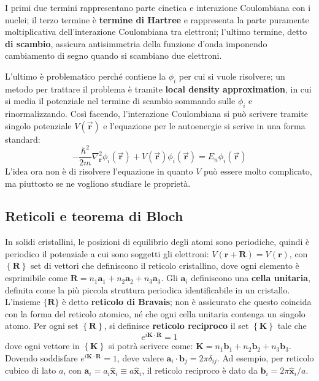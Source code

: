 \documentclass[10pt, a4paper]{scrartcl}
\numberwithin{equation}{subsection}
\theoremstyle{style1}
\begin{document}
I primi due termini rappresentano parte cinetica e interazione Coulombiana con i nuclei; il terzo termine \`e \textbf{termine di Hartree} e rappresenta la parte puramente moltiplicativa dell'interazione Coulombiana tra elettroni; l'ultimo termine, detto \textbf{di scambio}, assicura antisimmetria della funzione d'onda imponendo cambiamento di segno quando si scambiano due elettroni.

L'ultimo \`e problematico perch\'e contiene la $\phi _i$ per cui si vuole risolvere;
un metodo per trattare il problema \`e tramite \textbf{local density approximation}, in cui si media il potenziale nel termine di scambio sommando sulle $\phi _i$ e rinormalizzando. 
Cos\`i facendo, l'interazione Coulombiana si pu\`o scrivere tramite singolo potenziale $V(\vec{\mathbf{r} })$ e l'equazione per le autoenergie si scrive in una forma standard:
\begin{equation}\label{eser}
	-\frac{\hbar ^2}{2m} \nabla ^2_\mathbf{r} \phi _i(\vec{\mathbf{r} }) + V(\vec{\mathbf{r} }) \phi _i (\vec{\mathbf{r} }) = E_n \phi _i (\vec{\mathbf{r} })
\end{equation}
L'idea ora non \`e di risolvere l'equazione in quanto $V$ pu\`o essere molto complicato, ma piuttosto se ne vogliono studiare le propriet\`a.
\subsection{Reticoli e teorema di Bloch}
In solidi cristallini, le posizioni di equilibrio degli atomi sono periodiche, quindi \`e periodico il potenziale a cui sono soggetti gli elettroni: $V(\mathbf{r} +\mathbf{R} ) = V(\mathbf{r} )$, con $\left\{ \mathbf{R}  \right\} $ set di vettori che definiscono il reticolo cristallino, dove ogni elemento \`e esprimibile come $\mathbf{R} = n_1\mathbf{a} _1 + n_2 \mathbf{a} _2 + n_3 \mathbf{a} _3$. 
Gli $\mathbf{a} _i$ definiscono una \textbf{cella unitaria}, definita come la pi\`u piccola struttura periodica identificabile in un cristallo. 
L'insieme $\{\mathbf{R} \}$ \`e detto \textbf{reticolo di Bravais}; non \`e assicurato che questo coincida con la forma del reticolo atomico, n\'e che ogni cella unitaria contenga un singolo atomo.
Per ogni set $\left\{ \mathbf{R}  \right\} $, si definisce \textbf{reticolo reciproco} il set $\left\{ \mathbf{K}  \right\} $ tale che
\[
e^{i \mathbf{K} \cdot \mathbf{R} }  =1 
\] 
dove ogni vettore in $\left\{ \mathbf{K}  \right\} $ si potr\`a scrivere come: $\mathbf{K}  = n_1 \mathbf{b} _1 + n_2 \mathbf{b} _2 + n_3 \mathbf{b} _3$.
Dovendo soddisfare $e^{i \mathbf{K} \cdot \mathbf{R} } = 1$, deve valere $\mathbf{a} _i \cdot \mathbf{b} _j = 2\pi \delta _{ij} $.
Ad esempio, per reticolo cubico di lato $a$, con $\mathbf{a} _i = a_i \hat{\mathbf{x} }_i\equiv a \hat{\mathbf{x} }_i$, il reticolo reciproco \`e dato da $\mathbf{b} _i = 2\pi \hat{\mathbf{x} }_i / a$.
\end{document}
